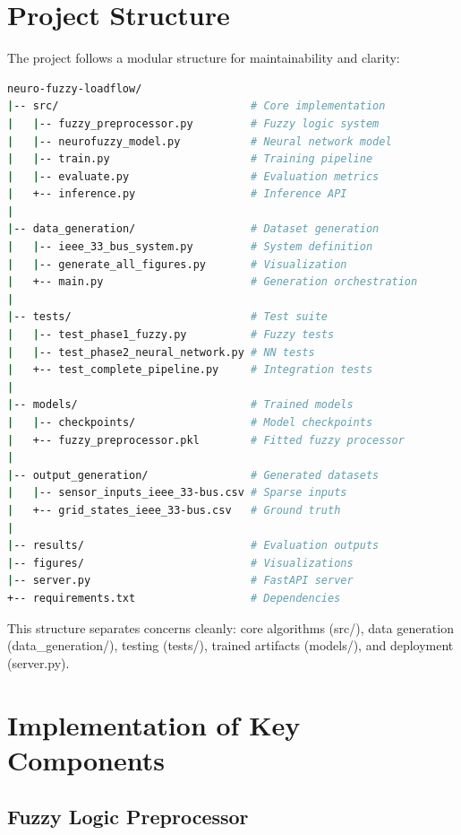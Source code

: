 \documentclass[12pt,a4paper]{report}
\begin{document}
\section{Project Structure}

The project follows a modular structure for maintainability and clarity:

\begin{lstlisting}[language=bash, caption={Project Directory Structure}]
neuro-fuzzy-loadflow/
|-- src/                              # Core implementation
|   |-- fuzzy_preprocessor.py         # Fuzzy logic system
|   |-- neurofuzzy_model.py           # Neural network model
|   |-- train.py                      # Training pipeline
|   |-- evaluate.py                   # Evaluation metrics
|   +-- inference.py                  # Inference API
|
|-- data_generation/                  # Dataset generation
|   |-- ieee_33_bus_system.py         # System definition
|   |-- generate_all_figures.py       # Visualization
|   +-- main.py                       # Generation orchestration
|
|-- tests/                            # Test suite
|   |-- test_phase1_fuzzy.py          # Fuzzy tests
|   |-- test_phase2_neural_network.py # NN tests
|   +-- test_complete_pipeline.py     # Integration tests
|
|-- models/                           # Trained models
|   |-- checkpoints/                  # Model checkpoints
|   +-- fuzzy_preprocessor.pkl        # Fitted fuzzy processor
|
|-- output_generation/                # Generated datasets
|   |-- sensor_inputs_ieee_33-bus.csv # Sparse inputs
|   +-- grid_states_ieee_33-bus.csv   # Ground truth
|
|-- results/                          # Evaluation outputs
|-- figures/                          # Visualizations
|-- server.py                         # FastAPI server
+-- requirements.txt                  # Dependencies
\end{lstlisting}

This structure separates concerns cleanly: core algorithms (src/), data generation (data\_generation/), testing (tests/), trained artifacts (models/), and deployment (server.py).

\section{Implementation of Key Components}

\subsection{Fuzzy Logic Preprocessor}
\end{document}
